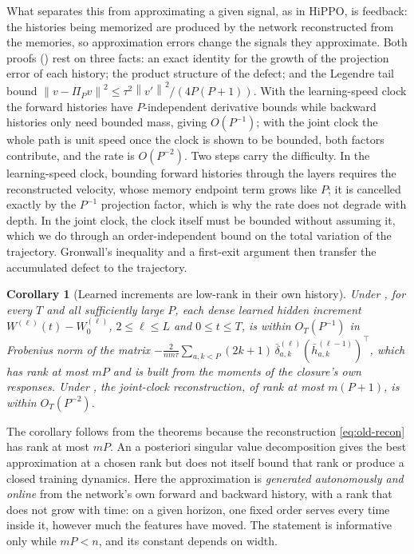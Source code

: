 \documentclass[11pt]{article}
\newtheorem{corollary}[theorem]{Corollary}
\theoremstyle{definition}
\theoremstyle{remark}
\newcommand{\norm}[1]{\left\lVert #1\right\rVert}
\begin{document}
What separates this from approximating a given signal, as in HiPPO, is feedback:
the histories being memorized are produced by the network reconstructed from
the memories, so approximation errors change the signals they approximate.  Both
proofs () rest on three facts: an exact
identity for the growth of the projection error of each history; the product
structure of the defect; and the Legendre tail bound
$\norm{v-\Pi_Pv}^2\le\tau^2\norm{v'}^2/(4P(P+1))$.  With the learning-speed clock
the forward histories have $P$-independent derivative bounds while backward
histories only need bounded mass, giving $O(P^{-1})$; with the joint clock the
whole path is unit speed once the clock is shown to be bounded, both factors
contribute, and the rate is $O(P^{-2})$.  Two steps carry the difficulty.  In
the learning-speed clock, bounding forward histories through the layers
requires the reconstructed velocity, whose memory endpoint term grows like $P$;
it is cancelled exactly by the $P^{-1}$ projection factor, which is why the rate
does not degrade with depth.  In the joint clock, the clock itself must be
bounded without assuming it, which we do through an order-independent bound on
the total variation of the trajectory.  Gronwall's inequality and a first-exit
argument then transfer the accumulated defect to the trajectory.

\begin{corollary}[Learned increments are low-rank in their own history]
\label{cor:rank}
Under , for every $T$ and all sufficiently large $P$, each dense
learned hidden increment $W^{(\ell)}(t)-W^{(\ell)}_0$, $2\le\ell\le L$ and
$0\le t\le T$, is within $O_T(P^{-1})$ in Frobenius norm of the matrix
$-\frac{2}{nm\tau}\sum_{a,k<P}(2k+1)\,\bar\delta^{(\ell)}_{a,k}(\bar h^{(\ell-1)}_{a,k})^\top$,
which has rank at most $mP$ and is built from the moments of the closure's own
responses.  Under , the joint-clock reconstruction, of rank at most
$m(P+1)$, is within $O_T(P^{-2})$.
\end{corollary}

The corollary follows from the theorems because the reconstruction
\eqref{eq:old-recon} has rank at most $mP$.  An a posteriori singular value
decomposition gives the best approximation at a chosen rank but does not itself
bound that rank or produce a closed training dynamics.  Here the approximation
is \emph{generated autonomously and online} from the
network's own forward and backward history, with a rank that does not grow
with time: on a given horizon, one fixed order serves every time inside it,
however much the features have moved.  The statement is informative only while
$mP<n$, and its constant depends on width.
\end{document}
